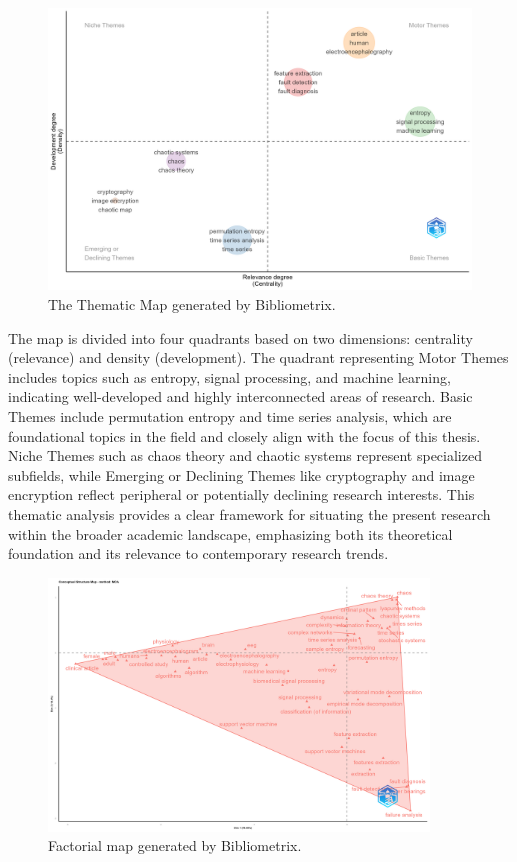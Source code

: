 \begin{figure}[H]
	\centering
	\includegraphics[width=\textwidth]{ThematicMap}
	\caption{The Thematic Map generated by Bibliometrix.}
	\label{fig:ThematicMap}
\end{figure}

The map is divided into four quadrants based on two dimensions: centrality (relevance) and density (development). The quadrant representing Motor Themes includes topics such as entropy, signal processing, and machine learning, indicating well-developed and highly interconnected areas of research. Basic Themes include permutation entropy and time series analysis, which are foundational topics in the field and closely align with the focus of this thesis. Niche Themes such as chaos theory and chaotic systems represent specialized subfields, while Emerging or Declining Themes like cryptography and image encryption reflect peripheral or potentially declining research interests. This thematic analysis provides a clear framework for situating the present research within the broader academic landscape, emphasizing both its theoretical foundation and its relevance to contemporary research trends.

\begin{figure}[H]
	\centering
	\includegraphics[width=0.9\textwidth]{FactorialMap}
	\caption{Factorial map generated by Bibliometrix.}
	\label{fig:factorialMap}
\end{figure}

